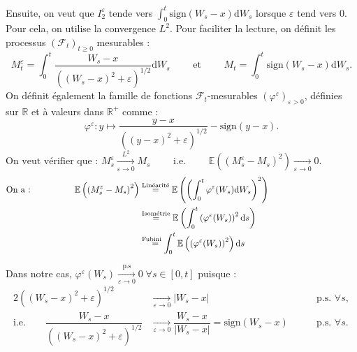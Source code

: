 \documentclass[openany]{book}
\makeatletter
\newcommand{\F}{\mathscr{F}}
\newcommand{\R}{\mathbb{R}}
\newcommand{\E}{\mathbb{E}}
\newcommand{\1}{\mathbbm{1}}
\newcommand{\sign}{\text{sign}}
\renewcommand{\d}{\mathrm{d}}
\renewenvironment{proof}[1][\textbf{\textit{Démonstration}}]{%
  \par\pushQED{\qed}%
  \normalfont\topsep6\p@\@plus6\p@\relax
  \trivlist\item[\hskip\labelsep
    #1\@addpunct{.}]\ignorespaces
}{%
  \popQED\endtrivlist\@endpefalse
}
\theoremstyle{thmfont}
\theoremstyle{deffont}
\theoremstyle{thmfont}
\theoremstyle{deffont}
\makeatother
\begin{document}
\begin{proof}
  
  \noindent Ensuite, on veut que \hyperlink{termI1}{$I_2^\varepsilon$} tende vers $\int_0^t \sign(W_s-x)\d W_s$ lorsque $\varepsilon$ tend vers $0$. Pour cela, on utilise la convergence $L^2$. Pour faciliter la lecture, on définit les processus $(\F_t)_{t\geq0}$ mesurables :
  $$M^\varepsilon_t = \int_0^t \dfrac{W_s-x}{((W_s-x)^2 +\varepsilon)^{1/2}}\d W_s \qquad\text{ et }\qquad M_t =  \int_0^t \sign(W_s -x)\d W_s.$$%
  On définit également la famille de fonctions $\F_t$-mesurables $(\varphi^\varepsilon)_{\varepsilon>0}$, définies sur $\R$ et à valeurs dans $\R^+$ comme :
  $$\varphi^\varepsilon : y \mapsto\dfrac{y-x}{((y-x)^2 +\varepsilon)^{1/2}} - \sign(y -x).$$
%
  $$\text{On veut vérifier que : }M^\varepsilon_s \xrightarrow[\varepsilon \to 0]{L^2} M_s \qquad \text{ i.e. } \qquad \E\left(\left(M^\varepsilon_s - M_s\right)^2\right) \xrightarrow[\varepsilon \to 0]{} 0.\qquad\qquad\qquad\qquad\qquad\qquad$$
\begin{align}
  \text{On a :}\qquad\qquad\quad
  \E\left(\left(M^\varepsilon_s - M_s\right)^2\right) &\overset{\text{Linéarité}}{=} \E \left( \left(\int_0^t\varphi^\varepsilon(W_s)\d W_s\right)^2 \right)\qquad\qquad\qquad\qquad\qquad\notag\\
  &\overset{\text{Isométrie}}{=} \E\left( \int_0^t\left( \varphi^\varepsilon(W_s) \right)^2 \d s\right)\label{arg:cvL2}\\
  &\overset{\text{Fubini}}{\;\;\;=}\int_0^t\E\left( \left(\varphi^\varepsilon(W_s)\right)^2 \right)\d s\notag
\end{align}


\noindent Dans notre cas, $\varphi^\varepsilon(W_s) \xrightarrow[\varepsilon \to 0]{\text{p.s}} 0\;\forall s \in [0,t]$ puisque :
\begin{alignat*}{2}
((W_s-x)^2 +\varepsilon)^{1/2} &\xrightarrow[\varepsilon\to 0]{} |W_s - x| \;\quad&&\text{p.s. } \forall s,\\
\text{i.e.}\qquad \dfrac{W_s-x}{((W_s-x)^2 +\varepsilon)^{1/2}} &\xrightarrow[\varepsilon \to 0]{} \dfrac{W_s-x}{|W_s - x|} = \sign(W_s -x)\quad\;&&\text{p.s. } \forall s.
\end{alignat*}



\end{proof}
\end{document}
